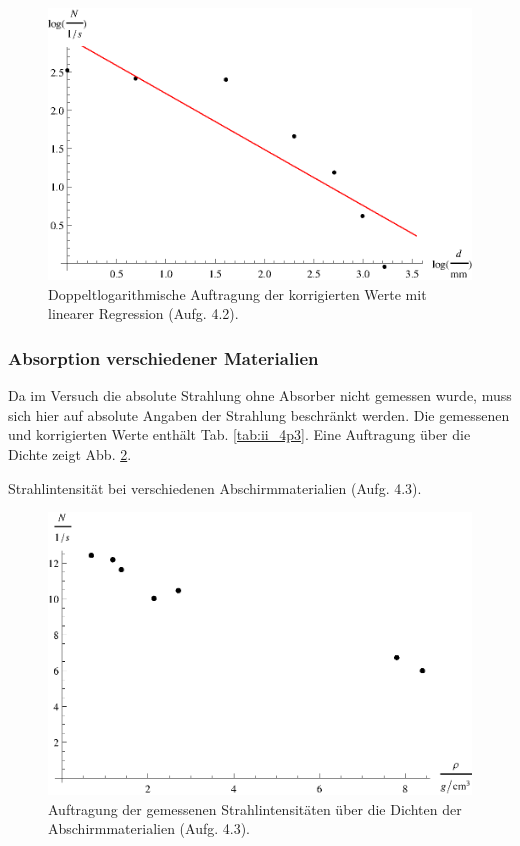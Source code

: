 \begin{figure}[tb]
	\centering
	\includegraphics[scale=1.0]{fig/ii_4p2.eps}
	\caption{Doppeltlogarithmische Auftragung der korrigierten Werte mit linearer Regression (Aufg. 4.2).}
	\label{fig:ii_4p2}
\end{figure}

\subsubsection{Absorption verschiedener Materialien}
Da im Versuch die absolute Strahlung ohne Absorber nicht gemessen wurde, muss sich hier auf absolute Angaben der Strahlung beschränkt werden. Die gemessenen und korrigierten Werte enthält Tab. \ref{tab:ii_4p3}. Eine Auftragung über die Dichte zeigt Abb. \ref{fig:ii_4p3}.

\begin{table}[tb]
	\centering
	\caption{Strahlintensität bei verschiedenen Abschirmmaterialien (Aufg. 4.3).}
	\label{tab:ii_4p3}
	
\end{table}

\begin{figure}[tb]
	\centering
	\includegraphics[scale=1.0]{fig/ii_4p3.eps}
	\caption{Auftragung der gemessenen Strahlintensitäten über die Dichten der Abschirmmaterialien (Aufg. 4.3).}
	\label{fig:ii_4p3}
\end{figure}